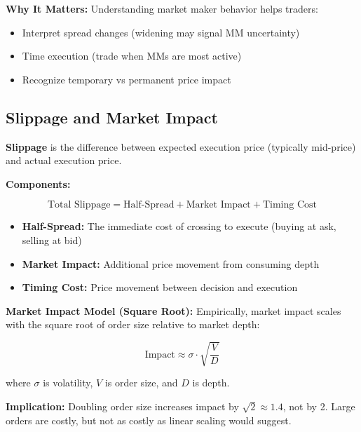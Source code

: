 \textbf{Why It Matters:} Understanding market maker behavior helps traders:
\begin{itemize}
    \item Interpret spread changes (widening may signal MM uncertainty)
    \item Time execution (trade when MMs are most active)
    \item Recognize temporary vs permanent price impact
\end{itemize}

\subsection{Slippage and Market Impact}
\label{method:slippage-appendix}

\textbf{Slippage} is the difference between expected execution price (typically mid-price) and actual execution price.

\textbf{Components:}

\begin{equation}
\text{Total Slippage} = \text{Half-Spread} + \text{Market Impact} + \text{Timing Cost}
\end{equation}

\begin{itemize}
    \item \textbf{Half-Spread:} The immediate cost of crossing to execute (buying at ask, selling at bid)
    \item \textbf{Market Impact:} Additional price movement from consuming depth
    \item \textbf{Timing Cost:} Price movement between decision and execution
\end{itemize}

\textbf{Market Impact Model (Square Root):} Empirically, market impact scales with the square root of order size relative to market depth:

\begin{equation}
\text{Impact} \approx \sigma \cdot \sqrt{\frac{V}{D}}
\end{equation}

where $\sigma$ is volatility, $V$ is order size, and $D$ is depth.

\textbf{Implication:} Doubling order size increases impact by $\sqrt{2} \approx 1.4$, not by 2. Large orders are costly, but not as costly as linear scaling would suggest.

